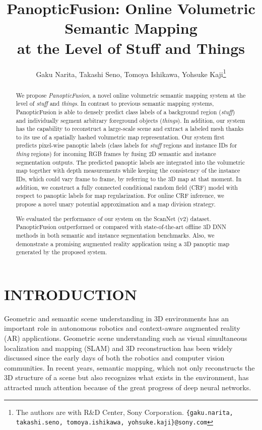 \documentclass[letterpaper, 10pt, conference]{latex_template/ieeeconf}
\title{\LARGE \bf
   PanopticFusion: Online Volumetric Semantic Mapping \\at the Level of Stuff and Things 
}
\author{
   Gaku Narita, Takashi Seno, Tomoya Ishikawa, Yohsuke Kaji\thanks{
      The authors are with R\&D Center, Sony Corporation. 
      {\tt\small \{gaku.narita, takashi.seno, tomoya.ishikawa, yohsuke.kaji\}@sony.com}
   }
}
\begin{document}
\maketitle
\thispagestyle{empty}
\pagestyle{empty}


\begin{abstract}
We propose {\it PanopticFusion}, a novel online volumetric semantic mapping system at the level of {\it stuff} and {\it things}.
In contrast to previous semantic mapping systems, PanopticFusion is able to densely predict class labels of a background region ({\it stuff}) and individually segment arbitrary foreground objects ({\it things}). In addition, our system has the capability to reconstruct a large-scale scene and extract a labeled mesh thanks to its use of a spatially hashed volumetric map representation.
Our system first predicts pixel-wise panoptic labels (class labels for {\it stuff} regions and instance IDs for {\it thing} regions) for incoming RGB frames by fusing 2D semantic and instance segmentation outputs. 
The predicted panoptic labels are integrated into the volumetric map together with depth measurements while keeping the consistency of the instance IDs, which could vary frame to frame, by referring to the 3D map at that moment.
In addition, we construct a fully connected conditional random field (CRF) model with respect to panoptic labels for map regularization. For online CRF inference, we propose a novel unary potential approximation and a map division strategy.

We evaluated the performance of our system on the ScanNet (v2) dataset. PanopticFusion outperformed or compared with state-of-the-art offline 3D DNN methods in both semantic and instance segmentation benchmarks. Also, we demonstrate a promising augmented reality application using a 3D panoptic map generated by the proposed system.
\end{abstract}


\section{INTRODUCTION}
Geometric and semantic scene understanding in 3D environments has an important role in autonomous robotics and context-aware augmented reality (AR) applications.
Geometric scene understanding such as visual simultaneous localization and mapping (SLAM) and 3D reconstruction has been widely discussed since the early days of both the robotics and computer vision communities. 
In recent years, semantic mapping, which not only reconstructs the 3D structure of a scene but also recognizes what exists in the environment, has attracted much attention because of the great progress of deep neural networks.
\end{document}
